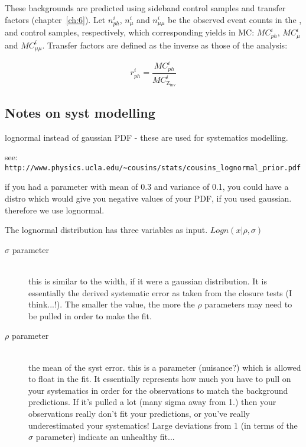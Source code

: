 These backgrounds are predicted using sideband control samples and transfer 
factors (chapter~\ref{ch:6}). Let $n_{ph}^i$, $n_{\mu}^i$ and $n_{\mu\mu}^i$ be 
the observed event counts in the \gj, \mj and \mmj control samples, 
respectively, which corresponding yields in MC: $MC_{ph}^i$, $MC_{\mu}^i$ and
$MC_{\mu\mu}^i$. Transfer factors are defined as the inverse as those of the 
analysis:

\begin{equation}
r_{ph}^i = \frac{MC_{ph}^i}{MC_{\text{Z}_{\text{inv}}}^i}
\end{equation}

\subsection{Notes on syst modelling}
lognormal instead of gaussian PDF - these are used for systematics modelling.

see:
\verb!http://www.physics.ucla.edu/~cousins/stats/cousins_lognormal_prior.pdf!

if you had a parameter with mean of 0.3 and variance of 0.1, you could have a 
distro which would give you negative values of your PDF, if you used gaussian. 
therefore we use lognormal.

The lognormal distribution has three variables as input. $Logn(x|\rho, \sigma)$

\begin{description}
\item[$\sigma$ parameter]\hfill \\ this is similar to the width, if it were a gaussian 
distribution. It is essentially the derived systematic error as taken from the 
closure tests (I think...!). The smaller the value, the more the $\rho$ 
parameters may need to be pulled in order to make the fit.
\item[$\rho$ parameter] \hfill \\ the mean of the syst error. this is a parameter
(nuisance?) which is allowed to float in the fit. It essentially represents how 
much you have to pull on your systematics in order for the observations to match
the background predictions. If it's pulled a lot (many sigma away from 1.) then 
your observations really don't fit your predictions, or you've really 
underestimated your systematics! Large deviations from 1 (in terms of the
$\sigma$ parameter) indicate an unhealthy fit...
\end{description}



